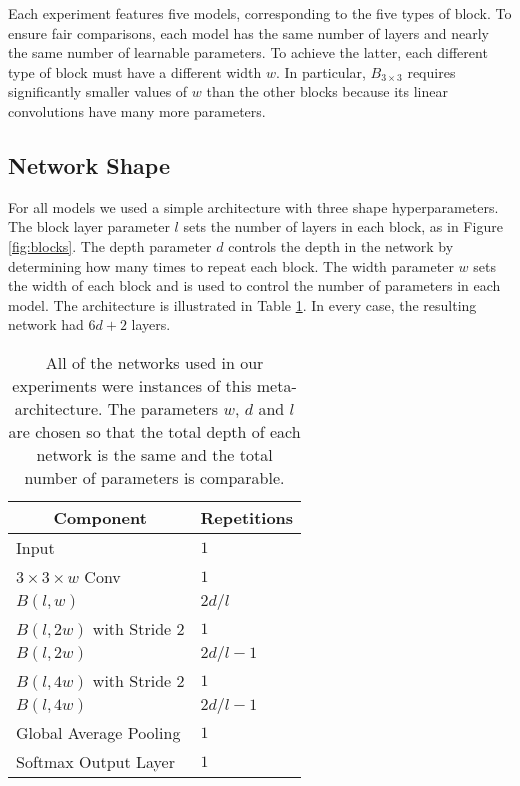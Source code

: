 \documentclass{article} %
\begin{document}
Each experiment features five models, corresponding to the five types of block.  To ensure fair comparisons, each model has the same number of layers and nearly the same number of learnable parameters. To achieve the latter, each different type of block must have a different width $w$. In particular, $B_{3\times 3}$ requires significantly smaller values of $w$ than the other blocks because its linear convolutions have many more parameters.


\subsection{Network Shape}

For all models we used a simple architecture with three shape hyperparameters. The block layer parameter $l$ sets the number of layers in each block, as in Figure \ref{fig:blocks}. The depth parameter $d$ controls the depth in the network by determining how many times to repeat each block. The width parameter $w$ sets the width of each block and is used to control the number of parameters in each model. The architecture is illustrated in Table \ref{table:arch}. In every case, the resulting network had $6d+2$ layers.   

\begin{table}[htb]
\centering
\begin{tabular}{l|l}
\multicolumn{1}{c}{\bf Component}  &\multicolumn{1}{c}{\bf Repetitions}
\\ \hline
Input         &$1$ \\
$3\times 3\times w$ Conv  &  $1$       \\
$B(l,w)$                  &  $2d/l$    \\
$B(l,2w)$ with Stride 2   &  $1$       \\
$B(l,2w)$                 &  $2d/l-1$  \\
$B(l,4w)$ with Stride 2   &  $1$       \\
$B(l,4w)$                 &  $2d/l-1$  \\
Global Average Pooling      &  $1$       \\
Softmax Output Layer          &  $1$       \\
\end{tabular}

\vspace{.025\linewidth}
\captionsetup{width=\linewidth}
\caption{All of the networks used in our experiments were instances of this meta-architecture.  The parameters $w$, $d$ and $l$ are chosen so that the total depth of each network is the same and the total number of parameters is comparable.}\label{table:arch}
\end{table}
\end{document}
